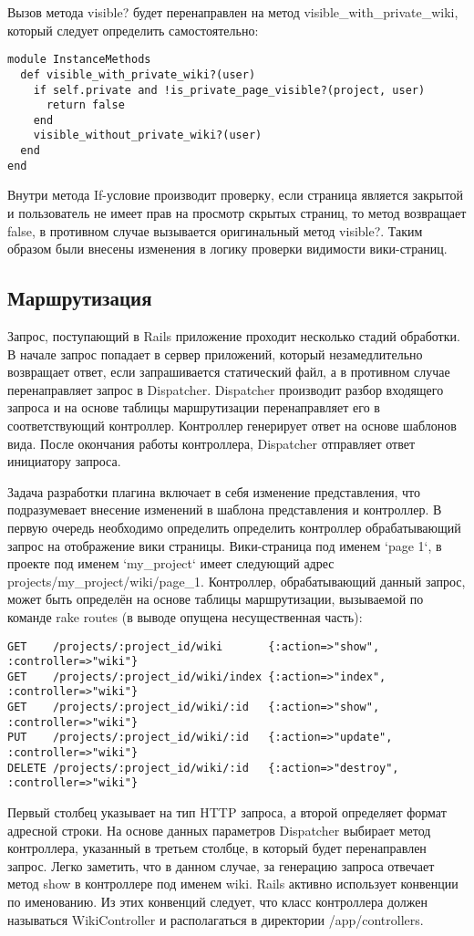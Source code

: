 Вызов метода visible? будет перенаправлен на метод
visible\_with\_private\_wiki, который следует определить
самостоятельно:
\small{\begin{lstlisting}
module InstanceMethods
  def visible_with_private_wiki?(user)  
    if self.private and !is_private_page_visible?(project, user)
      return false
    end
    visible_without_private_wiki?(user)
  end
end
\end{lstlisting}}
Внутри метода If-условие производит проверку, если страница является закрытой и
пользователь не имеет прав на просмотр скрытых страниц, то метод возвращает
false, в противном случае вызывается оригинальный метод visible?. Таким образом
были внесены изменения в логику проверки видимости вики-страниц.

\subsection{Маршрутизация}
Запрос, поступающий в Rails приложение проходит несколько стадий обработки. В
начале запрос попадает в сервер приложений, который незамедлительно возвращает
ответ, если запрашивается статический файл, а в противном случае перенаправляет
запрос в Dispatcher. Dispatcher производит разбор входящего запроса и на основе
таблицы маршрутизации перенаправляет его в соответствующий контроллер.
Контроллер генерирует ответ на основе шаблонов вида. После окончания работы
контроллера, Dispatcher отправляет ответ инициатору запроса.

Задача разработки плагина включает в себя изменение представления, что
подразумевает внесение изменений в шаблона представления и контроллер. В первую
очередь необходимо определить определить контроллер обрабатывающий запрос на
отображение вики страницы. Вики-страница под именем `page 1`, в проекте под
именем `my\_project` имеет следующий адрес projects/my\_project/wiki/page\_1.
Контроллер, обрабатывающий данный запрос, может быть определён на основе
таблицы маршрутизации, вызываемой по команде rake routes (в выводе опущена
несущественная часть):
\small{\begin{lstlisting}
GET    /projects/:project_id/wiki       {:action=>"show", :controller=>"wiki"}
GET    /projects/:project_id/wiki/index {:action=>"index", :controller=>"wiki"}
GET    /projects/:project_id/wiki/:id   {:action=>"show", :controller=>"wiki"}
PUT    /projects/:project_id/wiki/:id   {:action=>"update", :controller=>"wiki"}
DELETE /projects/:project_id/wiki/:id   {:action=>"destroy", :controller=>"wiki"}
\end{lstlisting}}
Первый столбец указывает на тип HTTP запроса, а второй определяет формат
адресной строки. На основе данных параметров Dispatcher выбирает метод
контроллера, указанный в третьем столбце, в который будет перенаправлен запрос.
Легко заметить, что в данном случае, за генерацию запроса отвечает метод show в
контроллере под именем wiki. Rails активно использует конвенции по именованию.
Из этих конвенций следует, что класс контроллера должен называться
WikiController и располагаться в директории /app/controllers.

